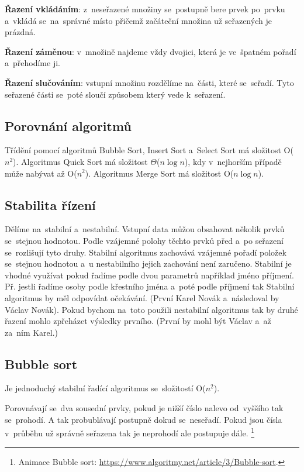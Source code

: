 \textbf{Řazení vkládáním}: z~neseřazené množiny se~postupně bere prvek po~prvku a~vkládá se~na~správné místo přičemž začáteční množina už seřazených je prázdná.

\textbf{Řazení záměnou}: v~množině najdeme vždy dvojici, která je ve~špatném pořadí a~přehodíme ji.

\textbf{Řazení slučováním}: vstupní množinu rozdělíme na~části, které se~seřadí. Tyto seřazené části se~poté sloučí způsobem který vede k~seřazení.

\subsection{Porovnání algoritmů}

Třídění pomocí algoritmů Bubble Sort, Insert Sort a~Select Sort má složitost O($n^2$). Algoritmus Quick Sort má složitost $\Theta$($n\log{n}$), kdy v~nejhorším případě může nabývat až O($n^2$). Algoritmus Merge Sort má složitost O($n\log{n}$).

\subsection{Stabilita řízení}

Dělíme na~stabilní a~nestabilní. Vstupní data můžou obsahovat několik prvků se~stejnou hodnotou. Podle vzájemné polohy těchto prvků před a~po seřazení se~rozlišují tyto druhy. Stabilní algoritmus zachovává vzájemné pořadí položek se~stejnou hodnotou a~u nestabilního jejich zachování není zaručeno. Stabilní je vhodné využívat pokud řadíme podle dvou parametrů například jméno příjmení. Př. jestli řadíme osoby podle křestního jména a~poté podle příjmení tak Stabilní algoritmus by měl odpovídat očekávání. (První Karel Novák a~následoval by Václav Novák). Pokud bychom na~toto použili nestabilní algoritmus tak by druhé řazení mohlo zpřeházet výsledky prvního. (První by mohl být Václav a~až za~ním Karel.)

\subsection{Bubble sort}

Je jednoduchý stabilní řadící algoritmus se~složitostí O($n^2$).

Porovnávají se~dva sousední prvky, pokud je nižší číslo nalevo od~vyššího tak se~prohodí. A tak probublávají postupně dokud se~neseřadí. Pokud jsou čísla v~průběhu už správně seřazena tak je neprohodí ale postupuje dále.%
\footnote{Animace Bubble sort: \url{https://www.algoritmy.net/article/3/Bubble-sort}.}

